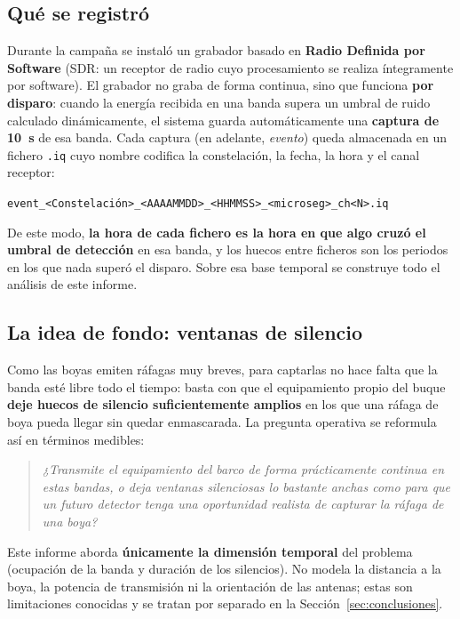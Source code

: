 \subsection{Qué se registró}

Durante la campaña se instaló un grabador basado en \textbf{Radio Definida por Software} (SDR: un receptor de radio cuyo procesamiento se realiza íntegramente por software). El grabador no graba de forma continua, sino que funciona \textbf{por disparo}: cuando la energía recibida en una banda supera un umbral de ruido calculado dinámicamente, el sistema guarda automáticamente una \textbf{captura de \SI{10}{\second}} de esa banda. Cada captura (en adelante, \textit{evento}) queda almacenada en un fichero \texttt{.iq} cuyo nombre codifica la constelación, la fecha, la hora y el canal receptor:

\begin{center}
\texttt{event\_<Constelación>\_<AAAAMMDD>\_<HHMMSS>\_<microseg>\_ch<N>.iq}
\end{center}

De este modo, \textbf{la hora de cada fichero es la hora en que algo cruzó el umbral de detección} en esa banda, y los huecos entre ficheros son los periodos en los que nada superó el disparo. Sobre esa base temporal se construye todo el análisis de este informe.

\subsection{La idea de fondo: ventanas de silencio}

Como las boyas emiten ráfagas muy breves, para captarlas no hace falta que la banda esté libre todo el tiempo: basta con que el equipamiento propio del buque \textbf{deje huecos de silencio suficientemente amplios} en los que una ráfaga de boya pueda llegar sin quedar enmascarada. La pregunta operativa se reformula así en términos medibles:

\begin{quote}
\textit{¿Transmite el equipamiento del barco de forma prácticamente continua en estas bandas, o deja ventanas silenciosas lo bastante anchas como para que un futuro detector tenga una oportunidad realista de capturar la ráfaga de una boya?}
\end{quote}

Este informe aborda \textbf{únicamente la dimensión temporal} del problema (ocupación de la banda y duración de los silencios). No modela la distancia a la boya, la potencia de transmisión ni la orientación de las antenas; estas son limitaciones conocidas y se tratan por separado en la Sección~\ref{sec:conclusiones}.
